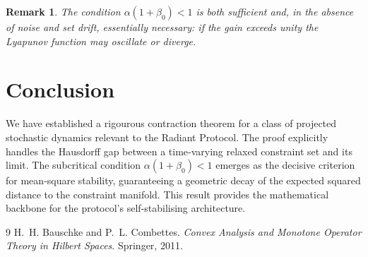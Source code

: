\documentclass[11pt]{article}
\newtheorem{remark}[theorem]{Remark}
\begin{document}
\begin{remark}
The condition \(\alpha(1+\beta_0) < 1\) is both sufficient and, in the absence of noise and set drift, essentially necessary: if the gain exceeds unity the Lyapunov function may oscillate or diverge.
\end{remark}

\section{Conclusion}

We have established a rigourous contraction theorem for a class of projected stochastic dynamics relevant to the Radiant Protocol. The proof explicitly handles the Hausdorff gap between a time‑varying relaxed constraint set and its limit. The subcritical condition \(\alpha(1+\beta_0)<1\) emerges as the decisive criterion for mean‑square stability, guaranteeing a geometric decay of the expected squared distance to the constraint manifold. This result provides the mathematical backbone for the protocol's self‑stabilising architecture.

\begin{thebibliography}{9}
H.~H. Bauschke and P.~L. Combettes.
\newblock \emph{Convex Analysis and Monotone Operator Theory in Hilbert Spaces}.
\newblock Springer, 2011.
\end{thebibliography}
\end{document}
